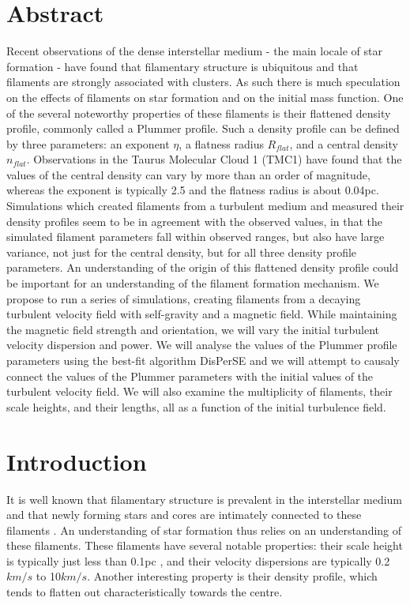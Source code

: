 \documentclass[a4paper,12pt]{article}
\begin{document}


\section{Abstract} Recent observations of the dense interstellar medium - the main locale of star formation - have found that filamentary structure is ubiquitous and that filaments are strongly associated with clusters. As such there is much speculation on the effects of filaments on star formation and on the initial mass function. One of the several noteworthy properties of these filaments is their flattened density profile, commonly called a Plummer profile. Such a density profile can be defined by three parameters: an exponent $\eta$, a flatness radius $R_{flat}$, and a central density $n_{flat}$. Observations in the Taurus Molecular Cloud 1 (TMC1) have found that the values of the central density can vary by more than an order of magnitude, whereas the exponent is typically 2.5 and the flatness radius is about 0.04pc. Simulations which created filaments from a turbulent medium and measured their density profiles seem to be in agreement with the observed values, in that the simulated filament parameters fall within observed ranges, but also have large variance, not just for the central density, but for all three density profile parameters. An understanding of the origin of this flattened density profile could be important for an understanding of the filament formation mechanism. We propose to run a series of simulations, creating filaments from a decaying turbulent velocity field with self-gravity and a magnetic field. While maintaining the magnetic field strength and orientation, we will vary the initial turbulent velocity dispersion and power. We will analyse the values of the Plummer profile parameters using the best-fit algorithm DisPerSE and we will attempt to causaly connect the values of the Plummer parameters with the initial values of the turbulent velocity field. We will also examine the multiplicity of filaments, their scale heights, and their lengths, all as a function of the initial turbulence field.

\section{Introduction} %

It is well known that filamentary structure is prevalent in the interstellar medium \citep{nut08} and that newly forming stars and cores are intimately connected to these filaments \citep{arz11}. An understanding of star formation thus relies on an understanding of these filaments. These filaments have several notable properties: their scale height is typically just less than 0.1pc \citep{arz11} \citep{fm12} \citep{hen13} \citep{pal13}, and their velocity dispersions are typically 0.2$km/s$ to 10$km/s$. Another interesting property is their density profile, which tends to flatten out characteristically towards the centre. \citep{jml12} \citep{nut08}\\
\end{document}
